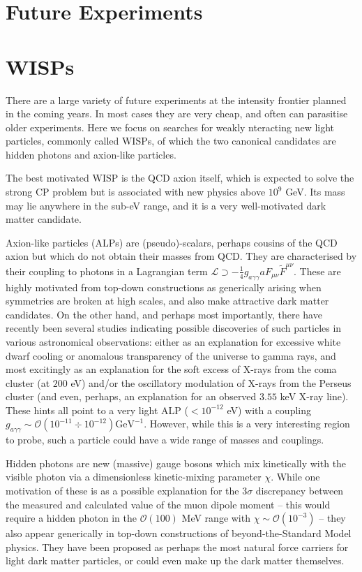 \section{Future Experiments}

\section{WISPs}

There are a large variety of future experiments at the intensity frontier planned in the coming years. In most cases they are very cheap, and often can parasitise older experiments. Here we focus on searches for weakly nteracting new light particles, commonly called WISPs, of which the two canonical candidates are hidden photons and axion-like particles. 

The best motivated WISP is the QCD axion itself, which is expected to solve the strong CP problem but is associated with new physics above $10^9$ GeV. Its mass may lie anywhere in the sub-eV range, and it is a very well-motivated dark matter candidate. 

Axion-like particles (ALPs) are (pseudo)-scalars, perhaps cousins of the QCD axion but which do not obtain their masses from QCD. They are characterised by their coupling to photons in a Lagrangian term $\mathcal{L} \supset - \frac{1}{4} g_{a\gamma \gamma} a F_{\mu \nu} \tilde{F}^{\mu \nu}.$ These are highly motivated from top-down constructions as generically arising when symmetries are broken at high scales, and also make attractive dark matter candidates. On the other hand, and perhaps most importantly, there have recently been several studies indicating possible discoveries of such particles in various astronomical observations: either as an explanation for excessive white dwarf cooling or anomalous transparency of the universe to gamma rays, and most excitingly as an explanation for the soft excess of X-rays from the coma cluster (at $200$ eV) and/or the oscillatory modulation of X-rays from the Perseus cluster (and even, perhaps, an explanation for an observed $3.55$ keV X-ray line). These hints all point to a very light ALP ($< 10^{-12}$ eV) with a coupling $g_{a\gamma \gamma} \sim \mathcal{O}(10^{-11} \div 10^{-12}) \mathrm{GeV}^{-1}.$ However, while this is a very interesting region to probe, such a particle could have a wide range of masses and couplings. 

Hidden photons are new (massive) gauge bosons which mix kinetically with the visible photon via a dimensionless kinetic-mixing parameter $\chi$. While one motivation of these is as a possible explanation for the $3\sigma$ discrepancy between the measured and calculated value of the muon dipole moment -- this would require a hidden photon in the $\mathcal{O}(100)$ MeV range with $\chi \sim \mathcal{O}(10^{-3})$ -- they also appear generically in top-down constructions of beyond-the-Standard Model physics. They have been proposed as perhaps the most natural force carriers for light dark matter particles, or could even make up the dark matter themselves.

